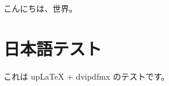 \documentclass[uplatex]{jsarticle}
\begin{document}
こんにちは、世界。

\section{日本語テスト}
これは upLaTeX + dvipdfmx のテストです。
\end{document}
